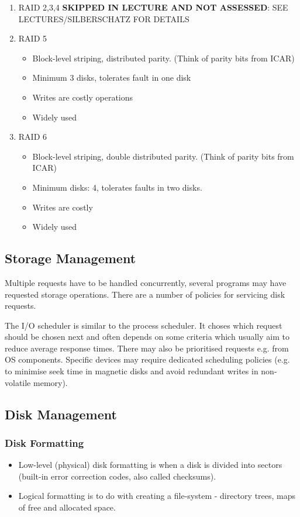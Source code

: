 \documentclass{article}%
\begin{document}
\begin{enumerate}
\item RAID 2,3,4
\label{sec:orgf30365f}
\textbf{SKIPPED IN LECTURE AND NOT ASSESSED}: SEE LECTURES/SILBERSCHATZ FOR DETAILS

\item RAID 5
\label{sec:orgf6a0085}
\begin{itemize}
\item Block-level striping, distributed parity. (Think of parity bits from ICAR)
\item Minimum 3 disks, tolerates fault in one disk
\item Writes are costly operations
\item Widely used
\end{itemize}

\item RAID 6
\label{sec:orge0377ca}
\begin{itemize}
\item Block-level striping, double distributed parity. (Think of parity bits from ICAR)
\item Minimum disks: 4, tolerates faults in two disks.
\item Writes are costly
\item Widely used
\end{itemize}
\end{enumerate}

\subsection{Storage Management}
\label{sec:orgfae50c7}
Multiple requests have to be handled concurrently, several programs may have requested storage operations.
There are a number of policies for servicing disk requests.

The I/O scheduler is similar to the process scheduler.
It choses which request should be chosen next and often depends on some criteria which usually aim to reduce average response times.
There may also be prioritised requests e.g. from OS components.
Specific devices may require dedicated scheduling policies (e.g. to minimise seek time in magnetic disks and avoid redundant writes in non-volatile memory).
\subsection{Disk Management}
\label{sec:org75dc5fa}
\subsubsection{Disk Formatting}
\label{sec:org7e5044f}
\begin{itemize}
\item Low-level (physical) disk formatting is when a disk is divided into sectors (built-in error correction codes, also called checksums).
\item Logical formatting is to do with creating a file-system - directory trees, maps of free and allocated space.
\end{itemize}
\end{document}
